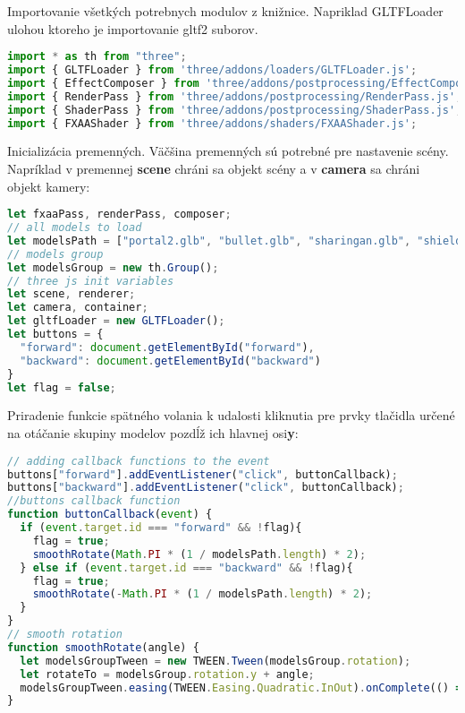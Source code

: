           Importovanie všetkých potrebnych modulov z knižnice. Napriklad GLTFLoader ulohou ktoreho je importovanie gltf2 suborov.
\begin{lstlisting}[language=JavaScript]
import * as th from "three";
import { GLTFLoader } from 'three/addons/loaders/GLTFLoader.js'; 
import { EffectComposer } from 'three/addons/postprocessing/EffectComposer.js';
import { RenderPass } from 'three/addons/postprocessing/RenderPass.js';
import { ShaderPass } from 'three/addons/postprocessing/ShaderPass.js';
import { FXAAShader } from 'three/addons/shaders/FXAAShader.js';
\end{lstlisting}

          Inicializácia premenných. Väčšina premenných sú potrebné pre nastavenie scény. Napríklad v premennej \textbf{scene} chráni sa objekt scény a v \textbf{camera} sa chráni objekt kamery:
\begin{lstlisting}[language=javascript]
let fxaaPass, renderPass, composer;
// all models to load
let modelsPath = ["portal2.glb", "bullet.glb", "sharingan.glb", "shieldBattery.glb", "triquetra.glb", "thor.glb"]
// models group
let modelsGroup = new th.Group();
// three js init variables
let scene, renderer;
let camera, container;
let gltfLoader = new GLTFLoader();
let buttons = {
  "forward": document.getElementById("forward"),
  "backward": document.getElementById("backward")
}
let flag = false;
\end{lstlisting}

        Priradenie funkcie spätného volania k udalosti kliknutia pre prvky tlačidla určené na otáčanie skupiny modelov pozdĺž ich hlavnej osi\textbf{y}:
\begin{lstlisting}[language=javascript]
// adding callback functions to the event
buttons["forward"].addEventListener("click", buttonCallback);
buttons["backward"].addEventListener("click", buttonCallback);
//buttons callback function
function buttonCallback(event) {
  if (event.target.id === "forward" && !flag){
    flag = true;
    smoothRotate(Math.PI * (1 / modelsPath.length) * 2);
  } else if (event.target.id === "backward" && !flag){
    flag = true;
    smoothRotate(-Math.PI * (1 / modelsPath.length) * 2);
  }
}
// smooth rotation
function smoothRotate(angle) {
  let modelsGroupTween = new TWEEN.Tween(modelsGroup.rotation);
  let rotateTo = modelsGroup.rotation.y + angle;
  modelsGroupTween.easing(TWEEN.Easing.Quadratic.InOut).onComplete(() => {flag = false}).to({ y: rotateTo }, 1000).start();
}
\end{lstlisting}

